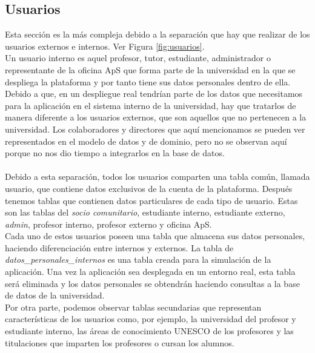 \documentclass[11pt]{book}
\begin{document}
	\subsection{Usuarios}
	Esta sección es la más compleja debido a la separación que hay que realizar de los usuarios externos e internos. Ver Figura \ref{fig:usuarios}.\\
	Un usuario interno es aquel profesor, tutor, estudiante, administrador o representante de la oficina ApS que forma parte de la universidad en la que se despliega la plataforma y por tanto tiene sus datos personales dentro de ella. Debido a que, en un despliegue real tendrían parte de los datos que necesitamos para la aplicación en el sistema interno de la universidad, hay que tratarlos de manera diferente a los usuarios externos, que son aquellos que no pertenecen a la universidad. Los colaboradores y directores que aquí mencionamos se pueden ver representados en el modelo de datos y de dominio, pero no se observan aquí porque no nos dio tiempo a integrarlos en la base de datos.\\\\
	Debido a esta separación, todos los usuarios comparten una tabla común, llamada usuario, que contiene datos exclusivos de la cuenta de la plataforma. Después tenemos tablas que contienen datos particulares de cada tipo de usuario. Estas son las tablas del \textit{socio comunitario}, estudiante interno, estudiante externo, \textit{admin}, profesor interno, profesor externo y oficina ApS.\\
	Cada uno de estos usuarios poseen una tabla que almacena sus datos personales, haciendo diferenciación entre internos y externos. La tabla de \textit{datos\_personales\_internos} es una tabla creada para la simulación de la aplicación. Una vez la aplicación sea desplegada en un entorno real, esta tabla será eliminada y los datos personales se obtendrán haciendo consultas a la base de datos de la universidad.\\
	Por otra parte, podemos observar tablas secundarias que representan características de los usuarios como, por ejemplo, la universidad del profesor y estudiante interno, las áreas de conocimiento UNESCO de los profesores y las titulaciones que imparten los profesores o cursan los alumnos.
\end{document}
